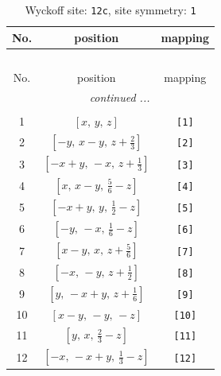 \documentclass[fleqn,8pt]{jsarticle}
\begin{document}
\begin{longtable}{ccc}
\caption{Wyckoff site: {\tt 12c}, site symmetry: {\tt 1}}
 \\
 \hline \hline
No. & position & mapping \\ \hline \endfirsthead

\multicolumn{2}{l}{\tablename\ \thetable{}} \\
 \hline \hline
No. & position & mapping \\ \hline \endhead

 \hline \hline
\multicolumn{2}{r}{\footnotesize\it continued ...} \\ \endfoot

 \hline \hline
\multicolumn{2}{r}{} \\ \endlastfoot

1 & $\left[ x,\, y,\, z \right]$ & {\tt [1]} \\ \hline
2 & $\left[ - y,\, x - y,\, z + \frac{2}{3} \right]$ & {\tt [2]} \\ \hline
3 & $\left[ - x + y,\, - x,\, z + \frac{1}{3} \right]$ & {\tt [3]} \\ \hline
4 & $\left[ x,\, x - y,\, \frac{5}{6} - z \right]$ & {\tt [4]} \\ \hline
5 & $\left[ - x + y,\, y,\, \frac{1}{2} - z \right]$ & {\tt [5]} \\ \hline
6 & $\left[ - y,\, - x,\, \frac{1}{6} - z \right]$ & {\tt [6]} \\ \hline
7 & $\left[ x - y,\, x,\, z + \frac{5}{6} \right]$ & {\tt [7]} \\ \hline
8 & $\left[ - x,\, - y,\, z + \frac{1}{2} \right]$ & {\tt [8]} \\ \hline
9 & $\left[ y,\, - x + y,\, z + \frac{1}{6} \right]$ & {\tt [9]} \\ \hline
10 & $\left[ x - y,\, - y,\, - z \right]$ & {\tt [10]} \\ \hline
11 & $\left[ y,\, x,\, \frac{2}{3} - z \right]$ & {\tt [11]} \\ \hline
12 & $\left[ - x,\, - x + y,\, \frac{1}{3} - z \right]$ & {\tt [12]} \\
\end{longtable}
\end{document}
